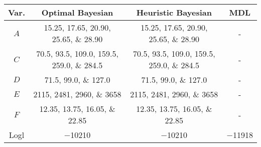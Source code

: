 \scriptsize
\begin{tabular}{@{}cccc@{}}
    \toprule
    Var. & Optimal Bayesian & Heuristic Bayesian & MDL \\
    \midrule
    $A$ & \numlist[list-final-separator = {, }]{15.25; 17.65; 20.90; 25.65; 28.90} & \numlist[list-final-separator = {, }]{15.25; 17.65; 20.90; 25.65; 28.90} & - \\
    $C$ & \numlist[list-final-separator = {, }]{70.5; 93.5; 109.0; 159.5; 259.0; 284.5} & \numlist[list-final-separator = {, }]{70.5;93.5;109.0;159.5;259.0;284.5} & - \\
    $D$ & \numlist[list-final-separator = {, }]{71.5;99.0;127.0} & \numlist[list-final-separator = {, }]{71.5;99.0; 127.0} & - \\
    $E$ & \numlist[list-final-separator = {, }]{2115;2481;2960;3658} & \numlist[list-final-separator = {, }]{2115;2481;2960;3658} & - \\
    $F$ & \numlist[list-final-separator = {, }]{12.35;13.75;16.05;22.85} & \numlist[list-final-separator = {, }]{12.35;13.75;16.05;22.85} & - \\
    \addlinespace[0.5em]
    Logl & \num{-10210} & \num{-10210} & \num{-11918} \\
    \bottomrule
\end{tabular}